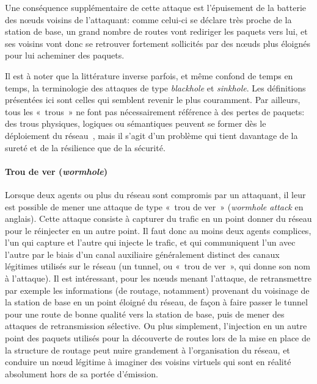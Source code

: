Une conséquence supplémentaire de cette attaque est l'épuisement de la batterie des nœuds voisins de l'attaquant: comme celui-ci se déclare très proche de la station de base, un grand nombre de routes vont rediriger les paquets vers lui, et ses voisins vont donc se retrouver fortement sollicités par des nœuds plus éloignés pour lui acheminer des paquets.

Il est à noter que la littérature inverse parfois, et même confond de temps en temps, la terminologie des attaques de type \textit{blackhole} et \textit{sinkhole}.
Les définitions présentées ici sont celles qui semblent revenir le plus couramment.
Par ailleurs, tous les « trous » ne font pas nécessairement référence à des pertes de paquets: des trous physiques, logiques ou sémantiques peuvent se former dès le déploiement du réseau~\cite{JSM13}, mais il s'agit d'un problème qui tient davantage de la sureté et de la résilience que de la sécurité.

        \paragraph{Trou de ver (\textit{wormhole})}
Lorsque deux agents ou plus du réseau sont compromis par un attaquant, il leur est possible de mener une attaque de type « trou de ver » (\textit{wormhole attack} en anglais).
Cette attaque consiste à capturer du trafic en un point donner du réseau pour le réinjecter en un autre point.
Il faut donc au moins deux agents complices, l'un qui capture et l'autre qui injecte le trafic, et qui communiquent l'un avec l'autre par le biais d'un canal auxiliaire généralement distinct des canaux légitimes utilisés sur le réseau (un tunnel, ou « trou de ver », qui donne son nom à l'attaque).
Il est intéressant, pour les nœuds menant l'attaque, de retransmettre par exemple les informations (de routage, notamment) provenant du voisinage de la station de base en un point éloigné du réseau, de façon à faire passer le tunnel pour une route de bonne qualité vers la station de base, puis de mener des attaques de retransmission sélective.
Ou plus simplement, l'injection en un autre point des paquets utilisés pour la découverte de routes lors de la mise en place de la structure de routage peut nuire grandement à l'organisation du réseau, et conduire un nœud légitime à imaginer des voisins virtuels qui sont en réalité absolument hors de sa portée d'émission.

